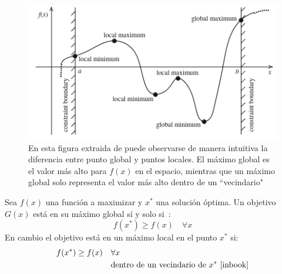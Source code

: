 \begin{figure}[H]
    \begin{center}
        \includegraphics[width=1.2\textwidth]{imagenes/min-max_points.png}
    \end{center}
    \caption{En esta figura extraida de \cite{inbook} puede observarse de manera intuitiva la diferencia entre punto global y puntos locales. El máximo global es el valor más alto para $f(x)$ en el espacio, mientras que un máximo global solo representa el valor más alto dentro de un ``vecindario"}
\end{figure}

Sea $f(x)$ una función a maximizar y $x^*$ una solución óptima. Un objetivo $G(x)$ está en su máximo global sí y solo si~\cite{inbook}:
\begin{equation}
    f(x^*) \geq f(x) \quad \forall x
\end{equation}
En cambio el objetivo está en un máximo local en el punto $x^*$ si:
\begin{equation}
    \begin{split}
        f(x^*) \geq f(x) \quad & \forall x \\
        & \text{dentro de un vecindario de } x^*\text{~\cite{inbook}}
    \end{split}
\end{equation}